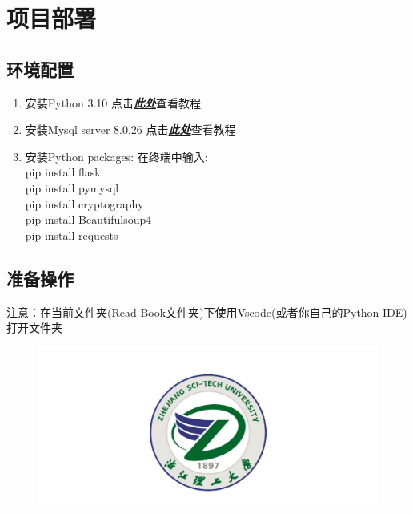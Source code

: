 \documentclass[twoside,11pt]{article}
\begin{document}
\section{项目部署}
\subsection{环境配置}
\begin{enumerate}
    \item 安装Python 3.10 点击\href{https://zhuanlan.zhihu.com/p/273378438}{\textbf{\emph{此处}}}查看教程
    \item 安装Mysql server 8.0.26 点击\href{https://zhuanlan.zhihu.com/p/188416607}{\textbf{\emph{此处}}}查看教程
    \item 安装Python packages: 在终端中输入:\\
          pip install flask\\
          pip install pymysql\\
          pip install cryptography\\
          pip install Beautifulsoup4\\
          pip install requests\\

\end{enumerate}
\subsection{准备操作}
注意：在当前文件夹(Read-Book文件夹)下使用Vscode(或者你自己的Python IDE)打开文件夹

\begin{figure}[H]
    \centering
    \includegraphics[width=1\columnwidth]{figures/zstu-logo.png}
\end{figure}
\end{document}
